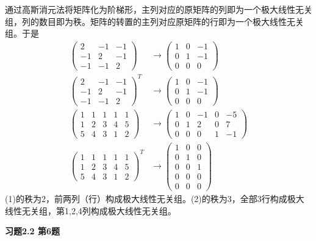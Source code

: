 通过高斯消元法将矩阵化为阶梯形，主列对应的原矩阵的列即为一个极大线性无关组，列的数目即为秩。矩阵的转置的主列对应原矩阵的行即为一个极大线性无关组。于是
\begin{align*}
\begin{pmatrix}2 & -1 & -1\\-1 & 2 & -1\\-1 & -1 & 2\end{pmatrix} & \to \begin{pmatrix}1 & 0 & -1\\0 & 1 & -1\\0 & 0 & 0\end{pmatrix} \\
\begin{pmatrix}2 & -1 & -1\\-1 & 2 & -1\\-1 & -1 & 2\end{pmatrix}^T & \to \begin{pmatrix}1 & 0 & -1\\0 & 1 & -1\\0 & 0 & 0\end{pmatrix} \\
\begin{pmatrix}1 & 1 & 1 & 1 & 1\\1 & 2 & 3 & 4 & 5\\5 & 4 & 3 & 1 & 2\end{pmatrix} & \to \begin{pmatrix}1 & 0 & -1 & 0 & -5\\0 & 1 & 2 & 0 & 7\\0 & 0 & 0 & 1 & -1\end{pmatrix} \\
\begin{pmatrix}1 & 1 & 1 & 1 & 1\\1 & 2 & 3 & 4 & 5\\5 & 4 & 3 & 1 & 2\end{pmatrix}^T & \to \begin{pmatrix}1 & 0 & 0\\0 & 1 & 0\\0 & 0 & 1\\0 & 0 & 0\\0 & 0 & 0\end{pmatrix}
\end{align*}
(1)的秩为2，前两列（行）构成极大线性无关组。(2)的秩为3，全部3行构成极大线性无关组，第1,2,4列构成极大线性无关组。

\newpageorvspace

{\bf 习题2.2 第6题}

